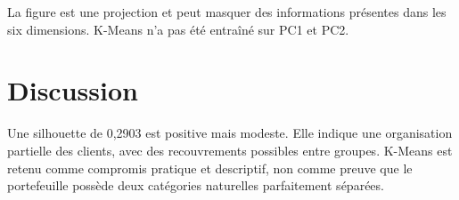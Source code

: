 
La figure est une projection et peut masquer des informations présentes dans les six dimensions. K-Means n'a pas été entraîné sur PC1 et PC2.

\section{Discussion}
Une silhouette de 0,2903 est positive mais modeste. Elle indique une organisation partielle des clients, avec des recouvrements possibles entre groupes. K-Means est retenu comme compromis pratique et descriptif, non comme preuve que le portefeuille possède deux catégories naturelles parfaitement séparées.
